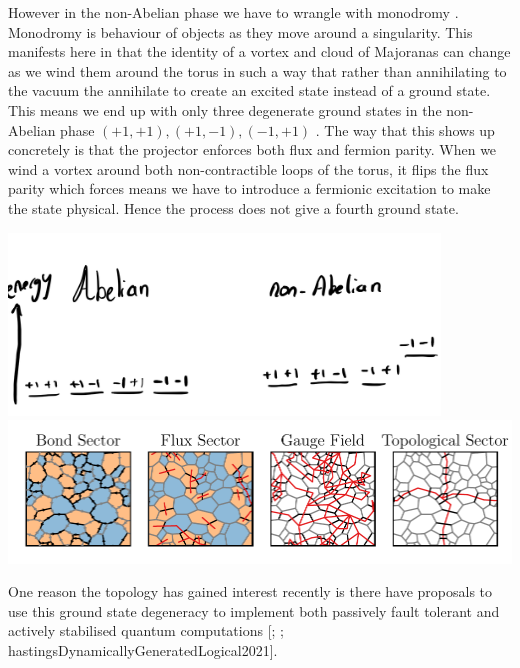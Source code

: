 However in the non-Abelian phase we have to wrangle with monodromy \autocite{chungExplicitMonodromyMoore2007,oshikawaTopologicalDegeneracyNonAbelian2007}. Monodromy is behaviour of objects as they move around a singularity. This manifests here in that the identity of a vortex and cloud of Majoranas can change as we wind them around the torus in such a way that rather than annihilating to the vacuum the annihilate to create an excited state instead of a ground state. This means we end up with only three degenerate ground states in the non-Abelian phase \((+1, +1), (+1, -1), (-1, +1)\) \autocite[yaoAlgebraicSpinLiquid2009a]{chungTopologicalQuantumPhase2010}. The way that this shows up concretely is that the projector enforces both flux and fermion parity. When we wind a vortex around both non-contractible loops of the torus, it flips the flux parity which forces means we have to introduce a fermionic excitation to make the state physical. Hence the process does not give a fourth ground state.

\includegraphics[width=0.86\textwidth,height=\textheight]{figure_code/amk_chapter/threefold_degeneracy.png} \includegraphics[width=1.14\textwidth,height=\textheight]{figure_code/amk_chapter/state_decomposition_animated/state_decomposition_animated.pdf}

One reason the topology has gained interest recently is there have proposals to use this ground state degeneracy to implement both passively fault tolerant and actively stabilised quantum computations {[}\textcite{kitaevFaulttolerantQuantumComputation2003}; \textcite{poulinStabilizerFormalismOperator2005}; hastingsDynamicallyGeneratedLogical2021{]}.
